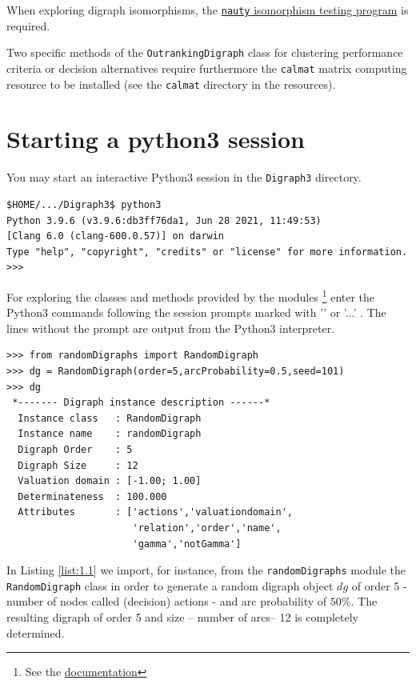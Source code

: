 When exploring digraph isomorphisms, the \href{https://www.cs.sunysb.edu/~algorith/implement/nauty/implement.shtml}{\texttt{nauty} isomorphism testing program} is required.

Two specific methods of the \texttt{OutrankingDigraph} class for clustering performance criteria or decision alternatives require furthermore the \texttt{calmat} matrix computing resource to be installed (see the \texttt{calmat} directory in the \Digraph resources).

\section{Starting a \Digraph python3 session}
\label{sec:1.2}
You may start an interactive Python3 session in the \texttt{Digraph3} directory.
\begin{footnotesize}
\begin{verbatim}
$HOME/.../Digraph3$ python3
Python 3.9.6 (v3.9.6:db3ff76da1, Jun 28 2021, 11:49:53) 
[Clang 6.0 (clang-600.0.57)] on darwin
Type "help", "copyright", "credits" or "license" for more information.
>>>
\end{verbatim}
\end{footnotesize}
For exploring the classes and methods provided by the \Digraph modules \footnote{See the \href{https://digraph3.readthedocs.io/en/latest/}{\Digraph documentation}} enter the Python3 commands following the session prompts marked with '\>\>\>' or '...' . The lines without the prompt are output from the Python3 interpreter.

\begin{lstlisting}[caption={Generating a digraph instance},label=list:1.1]
>>> from randomDigraphs import RandomDigraph
>>> dg = RandomDigraph(order=5,arcProbability=0.5,seed=101)
>>> dg
 *------- Digraph instance description ------*
  Instance class   : RandomDigraph
  Instance name    : randomDigraph
  Digraph Order    : 5
  Digraph Size     : 12
  Valuation domain : [-1.00; 1.00]
  Determinateness  : 100.000
  Attributes       : ['actions','valuationdomain',
                      'relation','order','name',
                      'gamma','notGamma']
\end{lstlisting}
                   
In Listing \ref{list:1.1}  we import, for instance, from the \texttt{randomDigraphs} module the \texttt{RandomDigraph} class  in order to generate a random digraph object $dg$ of order 5 - number of nodes called (decision) actions - and arc probability of $50\%$. The resulting digraph of order 5 and size -- number of arcs-- 12 is completely determined.

